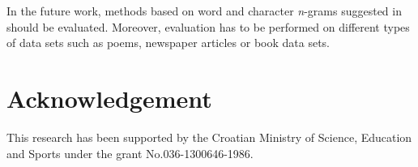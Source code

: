 \documentclass{llncs}
\begin{document}
In the future work, methods based on word and character \emph{n}-grams suggested
in \cite{keselj2003n,peng2003language,coyotl2006authorship} should be
evaluated. Moreover, evaluation has to be performed on different types of data sets
such as poems, newspaper articles or book data sets.

\section*{Acknowledgement}
This research has been supported by the Croatian Ministry of Science, Education
and Sports under the grant No.036-1300646-1986.



\end{document}
